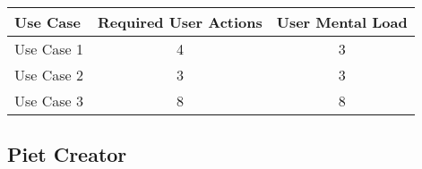 


\begin{tabularx}{\textwidth}{Xcc}
\textbf{Use Case} & \textbf{Required User Actions} & \textbf{User Mental Load}\\
\hline
Use Case 1                          & 4 & 3 \\
Use Case 2                          & 3 & 3 \\
Use Case 3                          & 8 & 8
\end{tabularx}

\subsection*{Piet Creator}




